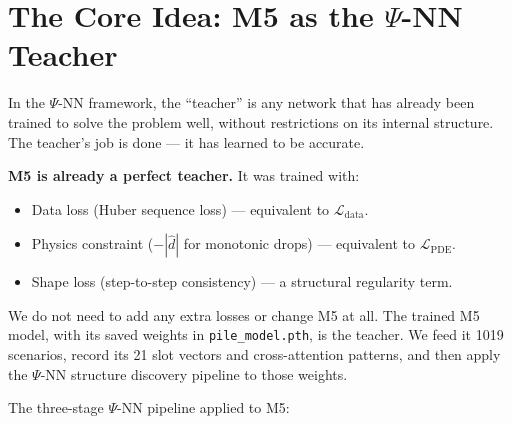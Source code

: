 \documentclass[11pt,a4paper]{article}
\begin{document}
\section{The Core Idea: M5 as the $\Psi$-NN Teacher}

In the $\Psi$-NN framework, the ``teacher'' is any network that has already been trained to solve the problem well, without restrictions on its internal structure. The teacher's job is done --- it has learned to be accurate.

\textbf{M5 is already a perfect teacher.} It was trained with:
\begin{itemize}[nosep]
    \item Data loss (Huber sequence loss) --- equivalent to $\mathcal{L}_{\text{data}}$.
    \item Physics constraint ($-|\hat{d}|$ for monotonic drops) --- equivalent to $\mathcal{L}_{\text{PDE}}$.
    \item Shape loss (step-to-step consistency) --- a structural regularity term.
\end{itemize}

We do not need to add any extra losses or change M5 at all. The trained M5 model, with its saved weights in \texttt{pile\_model.pth}, is the teacher. We feed it 1019 scenarios, record its 21 slot vectors and cross-attention patterns, and then apply the $\Psi$-NN structure discovery pipeline to those weights.

The three-stage $\Psi$-NN pipeline applied to M5:
\end{document}
